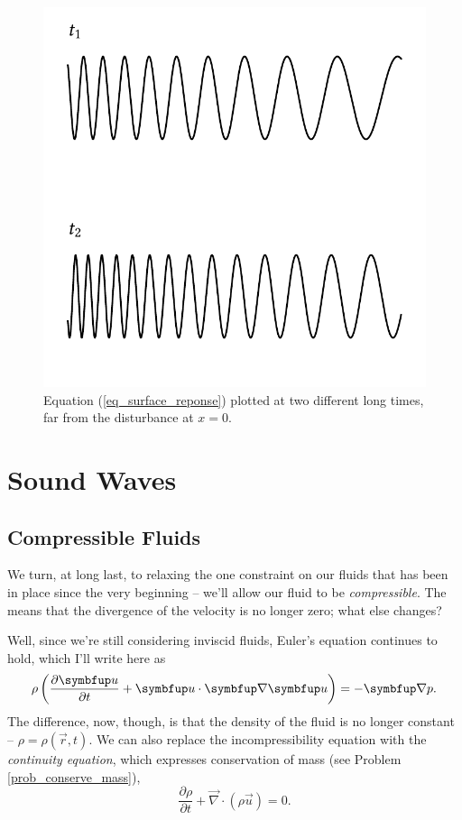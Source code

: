 \begin{figure}
\centering\includegraphics[width=0.7\linewidth]{Figures/Chapter5/fig_local_wave_example}
\caption{Equation (\ref{eq_surface_reponse}) plotted at two different long times, far from the disturbance at $x=0$.}
\label{fig_local_wave_example}
\end{figure}



%
%

\section{Sound Waves}


\subsection{Compressible Fluids}


We turn, at long last, to relaxing the one constraint on our fluids that has been in place since the very beginning -- we'll allow our fluid to be \emph{compressible}.  The means that the divergence of the velocity is no longer zero; what else changes?

Well, since we're still considering inviscid fluids, Euler's equation continues to hold, which I'll write here as
\begin{equation}
\rho \left( \dfdx{\vec{u}}{t} + \vec{u} \cdot \grad \vec{u} \right) = -\grad p.
\end{equation}
The difference, now, though, is that the density of the fluid is no longer constant -- $\rho = \rho(\vec{r}, t)$.  We can also replace the incompressibility equation with the \emph{continuity equation}, which expresses conservation of mass (see Problem \ref{prob_conserve_mass}),
\begin{equation}
\frac{\partial \rho}{\partial t} + \vec{\nabla} \cdot (\rho \vec{u} ) = 0.
\end{equation}


